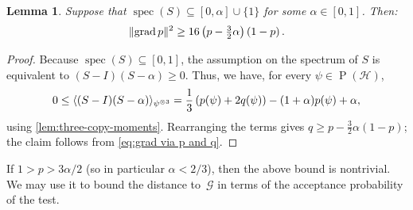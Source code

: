 \documentclass[11pt,a4paper]{article}
\newtheorem{lemma}[theorem]{Lemma}\AddToHook{env/lemma/begin}{\crefalias{theorem}{lemma}}
\numberwithin{equation}{section}
\newcommand{\ot}{\otimes}
\newcommand{\HH}{\mathcal{H}}
\newcommand{\GG}{\mathcal G}
\newcommand{\1}{\mathbf{1}}
\renewcommand{\P}{\operatorname{P}}
\DeclareMathOperator{\grad}{grad}
\DeclareMathOperator{\spec}{spec}
\DeclarePairedDelimiter\norm{\lVert}{\rVert}
\DeclarePairedDelimiter\ip{\langle}{\rangle}
\begin{document}
\begin{lemma}\label{lem:bound-gradient}
    Suppose that $\spec(S) \subseteq [0,\alpha] \cup \{1\}$ for some $\alpha\in[0,1]$.
    Then:
    \begin{align*}
        \norm{\grad p}^2 \geq 16 \left( p - \tfrac32\alpha \right) \left( 1 - p \right).
    \end{align*}
\end{lemma}
\begin{proof}
Because $\spec(S) \subseteq [0,1]$, the assumption on the spectrum of $S$ is equivalent to $(S - I)(S - \alpha) \geq 0$.
Thus, we have, for every $\psi\in\P(\HH)$,
\begin{align*}
    0
\leq \ip{ (S - I)(S - \alpha) }_{\psi^{\ot 3}}
= \frac13\left( p(\psi) + 2q(\psi) \right) - (1 + \alpha) p(\psi) + \alpha,
\end{align*}
using \cref{lem:three-copy-moments}.
Rearranging the terms gives $q \geq p - \frac32\alpha (1 - p)$; the claim follows from \cref{eq:grad via p and q}.
\end{proof}

If $1 > p > 3\alpha/2$ (so in particular $\alpha < 2/3$), then the above bound is nontrivial.
We may use it to bound the distance to~$\GG$ in terms of the acceptance probability of the test.
\end{document}
